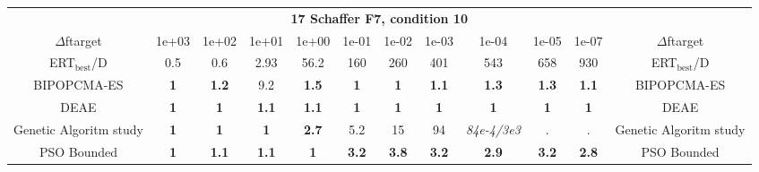 \begin{tabular}{cccccccccccc}
 & \multicolumn{10}{c}{{\normalsize \textbf{17 Schaffer F7, condition 10}}}\\
$\Delta$ftarget& 1e+03& 1e+02& 1e+01& 1e+00& 1e-01& 1e-02& 1e-03& 1e-04& 1e-05& 1e-07 & $\Delta$ftarget \\
ERT$_{\textrm{best}}$/D& 0.5& 0.6& 2.93& 56.2& 160& 260& 401& 543& 658& 930 & ERT$_{\textrm{best}}$/D \\
\hline
BIPOPCMA-ES & \textbf{1} & \textbf{1.2} & 9.2 & \textbf{1.5} & \textbf{1} & \textbf{1} & \textbf{1.1} & \textbf{1.3} & \textbf{1.3} & \textbf{1.1} & BIPOPCMA-ES \cite{add_an_entry_for_BIPOPCMA-ES_in_bbob.bib}\\
DEAE & \textbf{1} & \textbf{1} & \textbf{1.1} & \textbf{1.1} & \textbf{1} & \textbf{1} & \textbf{1} & \textbf{1} & \textbf{1} & \textbf{1} & DEAE \cite{add_an_entry_for_DEAE_in_bbob.bib}\\
Genetic Algoritm study & \textbf{1} & \textbf{1} & \textbf{1} & \textbf{2.7} & 5.2 & 15 & 94 & \textit{84e-4}\textit{/3e3} & . & . & Genetic Algoritm study \cite{add_an_entry_for_Genetic Algoritm study_in_bbob.bib}\\
PSO Bounded & \textbf{1} & \textbf{1.1} & \textbf{1.1} & \textbf{1} & \textbf{3.2} & \textbf{3.8} & \textbf{3.2} & \textbf{2.9} & \textbf{3.2} & \textbf{2.8} & PSO Bounded \cite{add_an_entry_for_PSO Bounded_in_bbob.bib}
\end{tabular}
